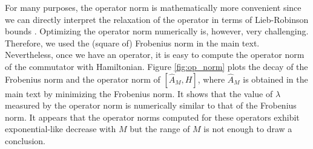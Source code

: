 \documentclass[twocolumn,superscriptaddress, prb]{revtex4-1}
\begin{document}
For many purposes, the operator norm is mathematically more convenient
since we can directly interpret the relaxation of the operator in terms of Lieb-Robinson bounds \cite{Lieb:1972,Bravyi:2006}.
Optimizing the operator norm numerically is, however, very challenging. Therefore, we used the (square of) Frobenius norm in the main text.
Nevertheless, once we have an operator, it is easy to compute the operator norm of the commutator with Hamiltonian.
Figure \ref{fig:op_norm} plots the decay of the Frobenius norm and the operator norm of $[\hat{A}_M,H]$,
where $\hat{A}_M$ is obtained in the main text by minimizing the Frobenius norm.
It shows that the value of $\lambda$ measured by the operator norm is numerically similar to that of the Frobenius norm.
It appears that the operator norms computed for these operators exhibit exponential-like decrease with $M$ but
the range of $M$ is not enough to draw a conclusion.
\end{document}
